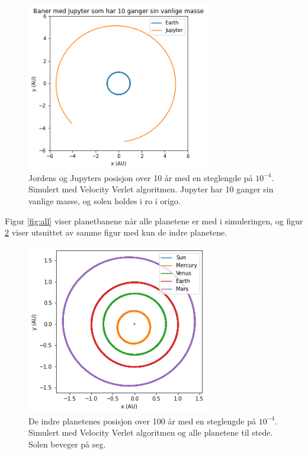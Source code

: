 \documentclass[reprint,english,notitlepage]{revtex4-1}
\begin{document}
	\begin{figure}[H]
		\includegraphics[width=80mm]{../../Code/Figures/jstat10.png}
		\caption{Jordens og Jupyters posisjon over 10 år med en steglengde på $10^{-4}$. Simulert med Velocity Verlet algoritmen. Jupyter har 10 ganger sin vanlige masse, og solen holdes i ro i origo.}
		\label{fig:jstat10}
	\end{figure}

	Figur \ref{fig:all} viser planetbanene når alle planetene er med i simuleringen, og figur \ref{fig:inner} viser utsnittet av samme figur med kun de indre planetene.

	\begin{figure}[H]
		\includegraphics[width=80mm]{../../Code/Figures/inner.png}
		\caption{De indre planetenes posisjon over 100 år med en steglengde på $10^{-4}$. Simulert med Velocity Verlet algoritmen og alle planetene til stede. Solen beveger på seg.}
		\label{fig:inner}
	\end{figure}
\end{document}
